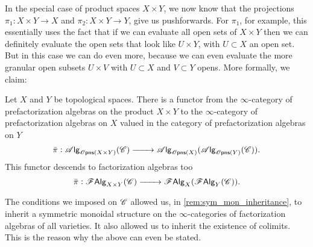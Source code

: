\documentclass[../text]{subfiles}
\begin{document}
In the special case of product spaces $X \times Y$, we now know that the projections $\pi_1: X \times Y \rightarrow X$ and $\pi_2: X \times Y \rightarrow Y$, give us pushforwards. For $\pi_1$, for example, this essentially uses the fact that if we can evaluate all open sets of $X \times Y$ then we can definitely evaluate the open sets that look like $U \times Y$, with $U \subset X$ an open set. But in this case we can do even more, because we can even evaluate the more granular open subsets $U \times V$ with $U \subset X$ and $V \subset Y$ opens. More formally, we claim:
%
\begin{proposition}\label{prop:exp_of_products}
    Let $X$ and $Y$ be topological spaces. There is a functor from the $\infty$-category of prefactorization algebras on the product $X \times Y$ to the $\infty$-category of prefactorization algebras on $X$ valued in the category of prefactorization algebras on $Y$
    \begin{equation}
        \bar{\pi}: \alg{\opens(X \times Y)}(\catC) \xrightarrow{\qquad} \alg{\opens(X)} (\alg{\opens(Y)} (\catC)).
    \end{equation}
    This functor descends to factorization algebras too
    \begin{equation}
        \bar{\pi}: \mathscr{F} \mathsf{Alg}_{X \times Y}(\mathscr{C}) \xrightarrow{\qquad} \mathscr{F} \mathsf{Alg}_{X}(\mathscr{F} \mathsf{Alg}_{Y}(\mathscr{C})).
    \end{equation}
\end{proposition}

\begin{remark}
    The conditions we imposed on $\mathscr{C}$ allowed us, in \cref{rem:sym_mon_inheritance}, to inherit a symmetric monoidal structure on the $\infty$-categories of factorization algebras of all varieties. It also allowed us to inherit the existence of colimits. This is the reason why the above can even be stated.
\end{remark}
\end{document}
